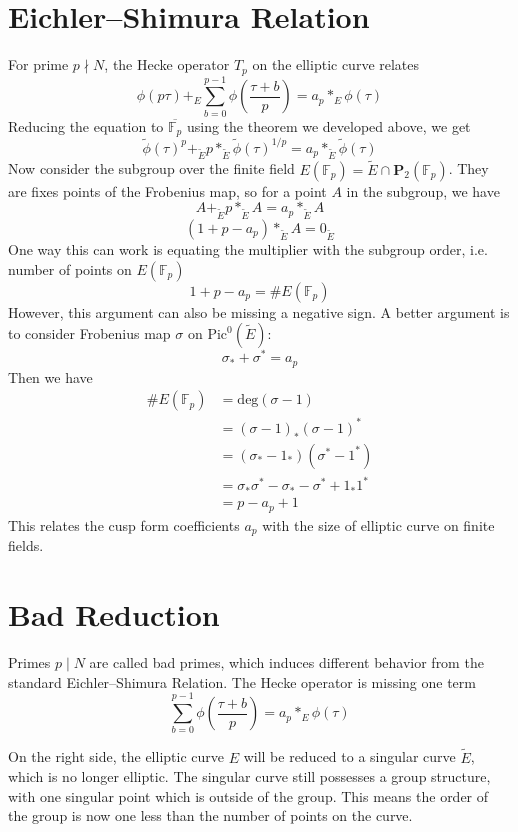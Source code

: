 \documentclass[]{article}
\begin{document}
\section{Eichler–Shimura Relation}
For prime $p\nmid N$, the Hecke operator $T_p$ on the elliptic curve relates 
\[
\phi\left(p\tau\right) +_E \sum_{b=0}^{p-1}\phi\left(\frac{\tau+b}{p}\right)  = a_p *_E \phi(\tau)
\]
Reducing the equation to $\overline{\mathbb{F}_p}$ using the theorem we developed above, we get
\[
\tilde{\phi}(\tau)^p +_{\tilde{E}} p *_{\tilde{E}} \tilde{\phi}(\tau)^{1/p} = a_p *_{\tilde{E}} \tilde{\phi}(\tau)
\]
Now consider the subgroup over the finite field $E(\mathbb{F}_p) = \tilde{E}\cap \mathbf{P}_2(\mathbb{F}_p)$. They are fixes points of the Frobenius map, so for a point $A$ in the subgroup, we have
\[
A +_{\tilde{E}} p *_{\tilde{E}} A = a_p *_{\tilde{E}} A
\]
\[
(1 + p - a_p) *_{\tilde{E}} A = 0_{\tilde{E}}
\]
One way this can work is equating the multiplier with the subgroup order, i.e. number of points on $E(\mathbb{F}_p)$
\[
1 + p - a_p = \# E(\mathbb{F}_p)
\]
However, this argument can also be missing a negative sign. A better argument is to consider Frobenius map $\sigma$ on $\mathrm{Pic}^0(\tilde{E})$:
\[
\sigma_* + \sigma^* = a_p 
\]
Then we have
\begin{align*}
\# E(\mathbb{F}_p) &= \mathrm{deg}(\sigma - 1) \\
&= (\sigma - 1)_* (\sigma - 1)^* \\
&= (\sigma_* - 1_*) (\sigma^* - 1^*) \\
&= \sigma_*\sigma^* - \sigma_* - \sigma^* + 1_*1^* \\
&= p - a_p + 1
\end{align*}
This relates the cusp form coefficients $a_p$ with the size of elliptic curve on finite fields.

\section{Bad Reduction}
Primes $p \mid N$ are called bad primes, which induces different behavior from the standard Eichler–Shimura Relation. The Hecke operator is missing one term
\[
\sum_{b=0}^{p-1}\phi\left(\frac{\tau+b}{p}\right)  = a_p *_E \phi(\tau)
\]

On the right side, the elliptic curve $E$ will be reduced to a singular curve $\tilde{E}$, which is no longer elliptic. The singular curve still possesses a group structure, with one singular point which is outside of the group. This means the order of the group is now one less than the number of points on the curve.
\end{document}
